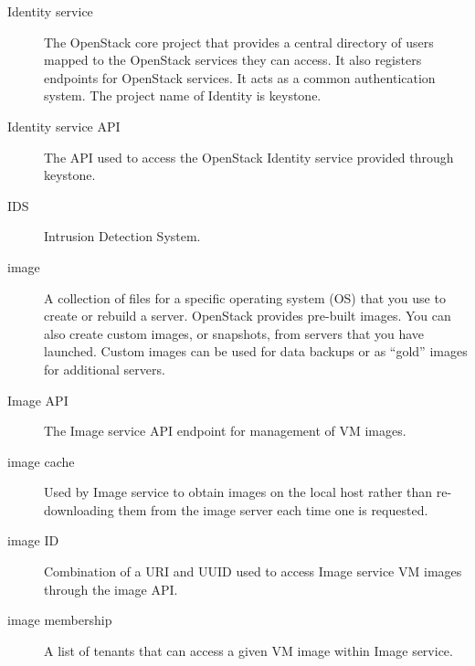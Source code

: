 \documentclass[letterpaper,10pt,english]{sphinxmanual}
\begin{document}
\begin{description}
\item[{Identity service}] \leavevmode{}\label{_source/glossary:term-identity-service}
The OpenStack core project that provides a central directory of
users mapped to the OpenStack services they can access. It also
registers endpoints for OpenStack services. It acts as a common
authentication system. The project name of Identity is
keystone.

\item[{Identity service API}] \leavevmode{}\label{_source/glossary:term-identity-service-api}
The API used to access the OpenStack Identity service provided
through keystone.

\item[{IDS}] \leavevmode{}\label{_source/glossary:term-ids}
Intrusion Detection System.

\item[{image}] \leavevmode{}\label{_source/glossary:term-image}
A collection of files for a specific operating system (OS) that
you use to create or rebuild a server. OpenStack provides pre-built
images. You can also create custom images, or snapshots, from servers
that you have launched. Custom images can be used for data backups or
as ``gold'' images for additional servers.

\item[{Image API}] \leavevmode{}\label{_source/glossary:term-image-api}
The Image service API endpoint for management of VM
images.

\item[{image cache}] \leavevmode{}\label{_source/glossary:term-image-cache}
Used by Image service to obtain images on the local host rather
than re-downloading them from the image server each time one is
requested.

\item[{image ID}] \leavevmode{}\label{_source/glossary:term-image-id}
Combination of a URI and UUID used to access Image service VM
images through the image API.

\item[{image membership}] \leavevmode{}\label{_source/glossary:term-image-membership}
A list of tenants that can access a given VM image within Image
service.


\end{description}
\end{document}
